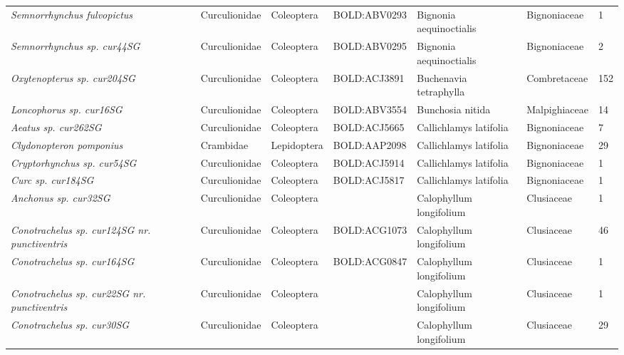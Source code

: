 \documentclass[11pt]{article}
\begin{document}
\begin{landscape}
\begin{longtable}{@{}lllllll@{}}
\textit{Semnorrhynchus fulvopictus}                   & Curculionidae   & Coleoptera   & BOLD:ABV0293 & Bignonia aequinoctialis            & Bignoniaceae     & 1     \\
\textit{Semnorrhynchus sp. cur44SG}                   & Curculionidae   & Coleoptera   & BOLD:ABV0295 & Bignonia aequinoctialis            & Bignoniaceae     & 2     \\
\textit{Oxytenopterus sp. cur204SG}                   & Curculionidae   & Coleoptera   & BOLD:ACJ3891 & Buchenavia tetraphylla             & Combretaceae     & 152   \\
\textit{Loncophorus sp. cur16SG}                      & Curculionidae   & Coleoptera   & BOLD:ABV3554 & Bunchosia nitida                   & Malpighiaceae    & 14    \\
\textit{Aeatus sp. cur262SG}                          & Curculionidae   & Coleoptera   & BOLD:ACJ5665 & Callichlamys latifolia             & Bignoniaceae     & 7     \\
\textit{Clydonopteron pomponius}                      & Crambidae       & Lepidoptera  & BOLD:AAP2098 & Callichlamys latifolia             & Bignoniaceae     & 29    \\
\textit{Cryptorhynchus sp. cur54SG}                   & Curculionidae   & Coleoptera   & BOLD:ACJ5914 & Callichlamys latifolia             & Bignoniaceae     & 1     \\
\textit{Curc sp. cur184SG}                            & Curculionidae   & Coleoptera   & BOLD:ACJ5817 & Callichlamys latifolia             & Bignoniaceae     & 1     \\
\textit{Anchonus sp. cur32SG}                         & Curculionidae   & Coleoptera   &              & Calophyllum longifolium            & Clusiaceae       & 1     \\
\textit{Conotrachelus sp. cur124SG nr. punctiventris} & Curculionidae   & Coleoptera   & BOLD:ACG1073 & Calophyllum longifolium            & Clusiaceae       & 46    \\
\textit{Conotrachelus sp. cur164SG}                   & Curculionidae   & Coleoptera   & BOLD:ACG0847 & Calophyllum longifolium            & Clusiaceae       & 1     \\
\textit{Conotrachelus sp. cur22SG nr. punctiventris}  & Curculionidae   & Coleoptera   &              & Calophyllum longifolium            & Clusiaceae       & 1     \\
\textit{Conotrachelus sp. cur30SG}                    & Curculionidae   & Coleoptera   &              & Calophyllum longifolium            & Clusiaceae       & 29    \\

\end{longtable}
\end{landscape}
\end{document}
